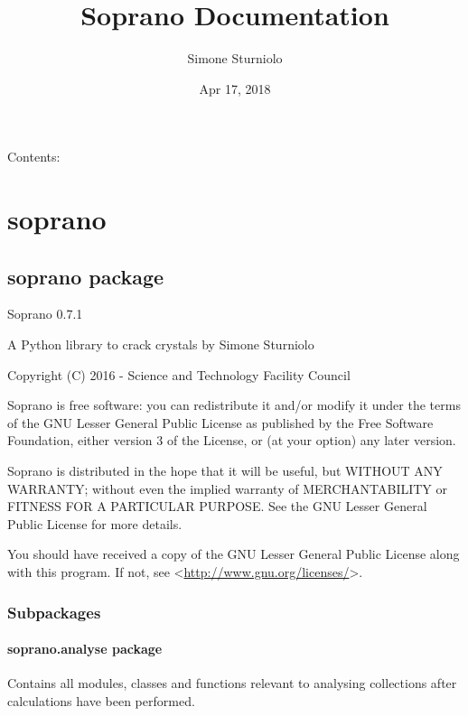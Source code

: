 \documentclass[letterpaper,10pt,english]{sphinxmanual}
\title{Soprano Documentation}
\date{Apr 17, 2018}
\author{Simone Sturniolo}
\begin{document}
\maketitle
\tableofcontents
{}\label{index::doc}


Contents:


\chapter{soprano}
\label{doctree/modules:welcome-to-soprano-s-documentation-release-release}\label{doctree/modules:soprano}\label{doctree/modules::doc}

\section{soprano package}
\label{doctree/soprano:module-soprano}\label{doctree/soprano::doc}\label{doctree/soprano:soprano-package}
Soprano 0.7.1

A Python library to crack crystals
by Simone Sturniolo

Copyright (C) 2016 - Science and Technology Facility Council

Soprano is free software: you can redistribute it and/or modify
it under the terms of the GNU Lesser General Public License as published by
the Free Software Foundation, either version 3 of the License, or
(at your option) any later version.

Soprano is distributed in the hope that it will be useful,
but WITHOUT ANY WARRANTY; without even the implied warranty of
MERCHANTABILITY or FITNESS FOR A PARTICULAR PURPOSE.  See the
GNU Lesser General Public License for more details.

You should have received a copy of the GNU Lesser General Public License
along with this program.  If not, see \textless{}\url{http://www.gnu.org/licenses/}\textgreater{}.


\subsection{Subpackages}
\label{doctree/soprano:subpackages}

\subsubsection{soprano.analyse package}
\label{doctree/soprano.analyse:module-soprano.analyse}\label{doctree/soprano.analyse:soprano-analyse-package}\label{doctree/soprano.analyse::doc}
Contains all modules, classes and functions relevant
to analysing collections after calculations have been performed.
\end{document}
